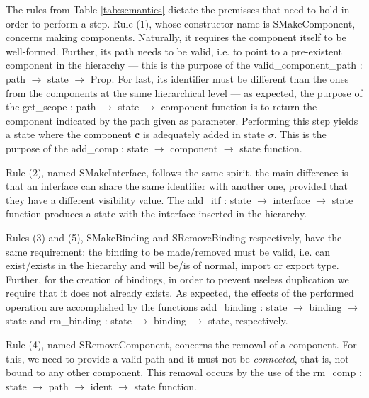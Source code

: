 	
  \noindent The rules from Table \ref{tab:semantics} dictate the premisses that need to hold
  in order to perform a step. Rule (1), whose constructor name is \textsf{SMakeComponent},
  concerns making \textsf{component}s. Naturally, it requires the \textsf{component} itself to be well-formed.
  Further, its \textsf{path} needs to be valid, i.e. to point to a pre-existent \textsf{component} in the hierarchy ---
  this is the purpose of the \textsf{valid\_component\_path : path $\rightarrow$ state $\rightarrow$ Prop}.
  For last, its \textsf{identifier} must be different than
  the ones from the \textsf{component}s at the same hierarchical level --- as expected, the purpose 
  of the \textsf{get\_scope : path $\rightarrow$ state $\rightarrow$ component} function is to
  return the \textsf{component} indicated by the \textsf{path} given as parameter. Performing this step
  yields a state where the \textsf{component} \textbf{c} is adequately added in state $\sigma$. This
  is the purpose of the \textsf{add\_comp : state $\rightarrow$ component $\rightarrow$ state} function.
    
  
  Rule (2), named \textsf{SMakeInterface}, follows the same spirit, the main difference is that
  an \textsf{interface} can share the same \textsf{identifier} with another one, provided that
  they have a different \textsf{visibility} value. The \textsf{add\_itf :  state $\rightarrow$ interface $\rightarrow$ state} 
  function produces a \textsf{state} with the \textsf{interface} inserted in the hierarchy.  
  

 Rules (3) and (5), \textsf{SMakeBinding} and \textsf{SRemoveBinding} respectively, 
 have the same requirement: the \textsf{binding}
 to be made/removed must be valid, i.e. can exist/exists in the hierarchy and will be/is
 of \textsf{normal}, \textsf{import} or \textsf{export} type. Further, for the creation of \textsf{binding}s, 
 in order to prevent useless duplication we require that it does not already exists. 
 As expected, the effects of the performed \textsf{operation} are accomplished by the
 functions \textsf{add\_binding : state $\rightarrow$ binding $\rightarrow$ state} 
 and \textsf{rm\_binding : state $\rightarrow$ binding $\rightarrow$ state}, respectively.
 
 Rule (4), named \textsf{SRemoveComponent}, concerns the removal of a \textsf{component}. For this, we need to 
 provide a valid \textsf{path} and it must not be \textit{connected}, that is, not bound to any other 
 \textsf{component}. This removal occurs by the use of the 
 \textsf{rm\_comp : state $\rightarrow$ path $\rightarrow$ ident $\rightarrow$ state} function.

